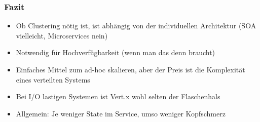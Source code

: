 \documentclass{beamer}
\begin{document}
\begin{frame}
  \frametitle{Fazit}

  \begin{itemize}
    \item Ob Clustering nötig ist, ist abhängig von der individuellen Architektur (SOA vielleicht, Microservices nein)

    \item Notwendig für Hochverfügbarkeit (wenn man das denn braucht)

    \item Einfaches Mittel zum ad-hoc skalieren, aber der Preis ist die Komplexität eines verteilten Systems

    \item Bei I/O lastigen Systemen ist Vert.x wohl selten der Flaschenhals

    \item Allgemein: Je weniger State im Service, umso weniger Kopfschmerz
  \end{itemize}
\end{frame}
\end{document}
